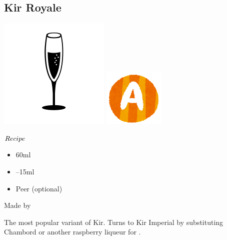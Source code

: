 \subsection{Kir Royale}
\vspace{-7.6mm}
\hspace{33mm}
\includegraphics[scale=.08]{cocktail_glass_flute.png}
\includegraphics[scale=.12]{capital_a.png}
\vspace{2.5mm}
\begin{itembox}[l]{\boldmath $Recipe$}
\begin{itemize}
\setlength{\parskip}{0cm}
\setlength{\itemsep}{0cm}
\item \champagne 60ml
\item {}--15ml
\item \lemon Peer (optional)
\end{itemize}
\vspace{-4mm}
Made by \build
\end{itembox}
The most popular variant of Kir. 
Turns to Kir Imperial by substituting Chambord or another raspberry liqueur for \cc
\hspace{-1mm}.
